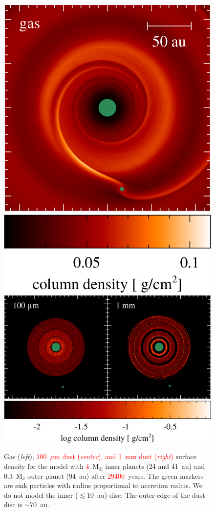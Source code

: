 \documentclass[usenatbib,a4paper,times]{mnras}
\renewcommand{\earth}{\mathrm{M}_{\oplus}}
\newcommand{\new}[1]{{\textcolor{red}{#1}}}
\begin{document}
\begin{figure}
   \begin{center}
      \includegraphics[height=0.460\columnwidth]{figs/gas.pdf}
      \includegraphics[height=0.460\columnwidth]{figs/dust.pdf}
      \caption{Gas (\textit{left}), \new{100~$\mu$m dust (\textit{center}), and
         1~mm dust (\textit{right})} surface density for the model with
         \new{4}~$\earth{}$ inner planets (24 and 41~au) and 0.3~$\mathrm{M_J}$
         outer planet (94~au) after \new{$29400$}~years. The green markers are
         sink particles with radius proportional to accretion radius. We do not
         model the inner ($\lesssim 10$~au) disc. The outer edge of the dust
         disc is $\sim 70$~au.\label{fig:surface-density}}
   \end{center}
\end{figure}
\end{document}
